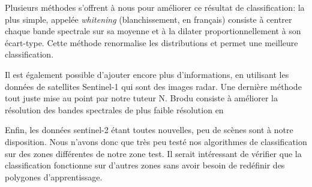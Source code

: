 \documentclass[a4paper,10pt]{article}
\begin{document}
Plusieurs méthodes s'offrent à nous pour améliorer ce résultat de classification: la plus simple, appelée \textit{whitening} (blanchissement, en français) consiste à centrer chaque bande spectrale sur sa moyenne et à la dilater proportionnellement à son écart-type. Cette méthode renormalise les distributions et permet une meilleure classification.

Il est également possible d'ajouter encore plus d'informations, en utilisant les données de satellites Sentinel-1 qui sont des images radar. Une dernière méthode tout juste mise au point par notre tuteur N. Brodu consiste à améliorer la résolution des bandes spectrales de plus faible résolution en 

Enfin, les données sentinel-2 étant toutes nouvelles, peu de scènes sont à notre disposition. Nous n'avons donc que très peu testé nos algorithmes de classification sur des zones différentes de notre zone test. Il serait intéressant de vérifier que la classification fonctionne sur d'autres zones sans avoir besoin de redéfinir des polygones d'apprentissage.



\end{document}

